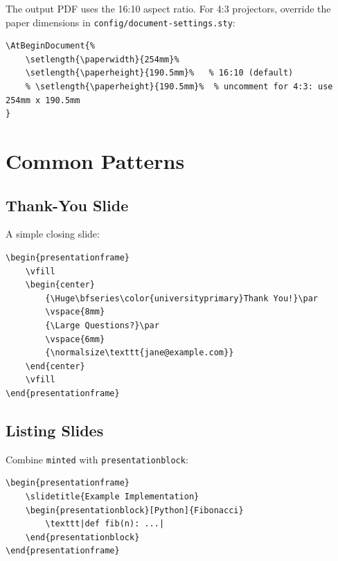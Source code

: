 The output PDF uses the 16:10 aspect ratio.  For 4:3 projectors, override the
paper dimensions in \texttt{config/document-settings.sty}:

\begin{verbatim}
\AtBeginDocument{%
    \setlength{\paperwidth}{254mm}%
    \setlength{\paperheight}{190.5mm}%   % 16:10 (default)
    % \setlength{\paperheight}{190.5mm}%  % uncomment for 4:3: use 254mm x 190.5mm
}
\end{verbatim}

\section{Common Patterns}

\subsection{Thank-You Slide}

A simple closing slide:

\begin{verbatim}
\begin{presentationframe}
    \vfill
    \begin{center}
        {\Huge\bfseries\color{universityprimary}Thank You!}\par
        \vspace{8mm}
        {\Large Questions?}\par
        \vspace{6mm}
        {\normalsize\texttt{jane@example.com}}
    \end{center}
    \vfill
\end{presentationframe}
\end{verbatim}

\subsection{Listing Slides}

Combine \texttt{minted} with \texttt{presentationblock}:

\begin{verbatim}
\begin{presentationframe}
    \slidetitle{Example Implementation}
    \begin{presentationblock}[Python]{Fibonacci}
        \texttt|def fib(n): ...|
    \end{presentationblock}
\end{presentationframe}
\end{verbatim}

